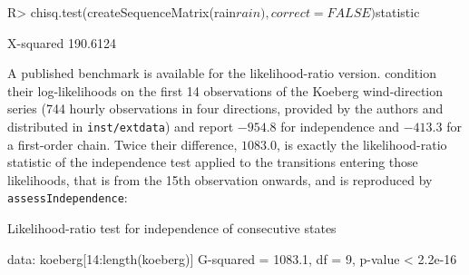 \documentclass[
  nojss]{jss}
\begin{document}
\begin{CodeChunk}
\begin{CodeInput}
R> chisq.test(createSequenceMatrix(rain$rain), correct = FALSE)$statistic
\end{CodeInput}
\begin{CodeOutput}
X-squared 
 190.6124 
\end{CodeOutput}
\end{CodeChunk}

A published benchmark is available for the likelihood-ratio version. \cite{berchtold2002mixture} condition their log-likelihoods on the first 14 observations of the Koeberg wind-direction series (744 hourly observations in four directions, provided by the authors and distributed in \texttt{inst/extdata}) and report \(-954.8\) for independence and \(-413.3\) for a first-order chain. Twice their difference, \(1083.0\), is exactly the likelihood-ratio statistic of the independence test applied to the transitions entering those likelihoods, that is from the 15th observation onwards, and is reproduced by \texttt{assessIndependence}:

\begin{CodeChunk}
\begin{CodeOutput}

    Likelihood-ratio test for independence of consecutive states

data:  koeberg[14:length(koeberg)]
G-squared = 1083.1, df = 9, p-value < 2.2e-16
\end{CodeOutput}
\end{CodeChunk}
\end{document}
